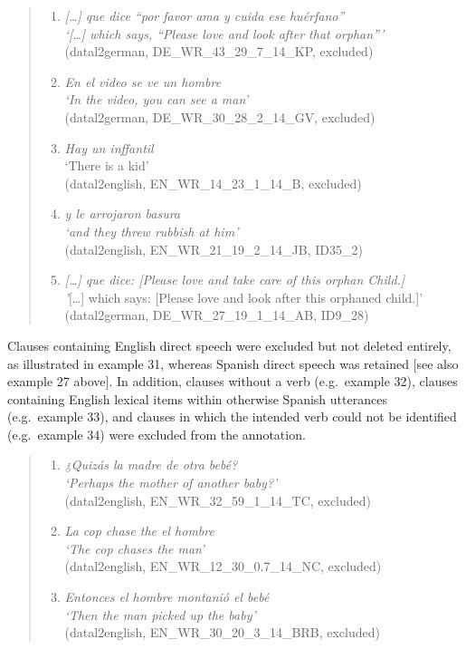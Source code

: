 \documentclass[
  letterpaper,
  DIV=11,
  numbers=noendperiod]{scrartcl}
\providecommand{\tightlist}{%
  \setlength{\itemsep}{0pt}\setlength{\parskip}{0pt}}
\begin{document}
\begin{quote}
\begin{enumerate}
\def\labelenumi{\arabic{enumi}.}
\setcounter{enumi}{26}
\item
  \emph{{[}\ldots{]} que dice ``por favor ama y cuida ese huérfano''\\
  `\emph{{[}\ldots{]} which says, ``Please love and look after that
  orphan''}'}\\
  (datal2german, DE\_WR\_43\_29\_7\_14\_KP, excluded)
\item
  \emph{En el video se ve un hombre\\
  `\emph{In the video, you can see a man}'}\\
  (datal2german, DE\_WR\_30\_28\_2\_14\_GV, excluded)
\item
  \emph{Hay un inffantil}\\
  `There is a kid'\\
  (datal2english, EN\_WR\_14\_23\_1\_14\_B, excluded)
\item
  \emph{y le arrojaron basura\\
  `\emph{and they threw rubbish at him}'}\\
  (datal2english, EN\_WR\_21\_19\_2\_14\_JB, ID35\_2)
\item
  \emph{{[}\ldots{]} que dice: {[}Please love and take care of this
  orphan Child.{]}\\
  '}{[}\ldots{]} which says: {[}Please love and look after this orphaned
  child.{]}'\\
  (datal2german, DE\_WR\_27\_19\_1\_14\_AB, ID9\_28)
\end{enumerate}
\end{quote}

Clauses containing English direct speech were excluded but not deleted
entirely, as illustrated in example 31, whereas Spanish direct speech
was retained {[}see also example 27 above{]}. In addition, clauses
without a verb (e.g.~example 32), clauses containing English lexical
items within otherwise Spanish utterances (e.g.~example 33), and clauses
in which the intended verb could not be identified (e.g.~example 34)
were excluded from the annotation.

\begin{quote}
\begin{enumerate}
\def\labelenumi{\arabic{enumi}.}
\setcounter{enumi}{31}
\tightlist
\item
  \emph{¿Quizás la madre de otra bebé?\\
  `\emph{Perhaps the mother of another baby?}'}\\
  (datal2english, EN\_WR\_32\_59\_1\_14\_TC, excluded)
\item
  \emph{La cop chase the el hombre\\
  `\emph{The cop chases the man}'}\\
  (datal2english, EN\_WR\_12\_30\_0.7\_14\_NC, excluded)
\item
  \emph{Entonces el hombre montanió el bebé\\
  `\emph{Then the man picked up the baby}'}\\
  (datal2english, EN\_WR\_30\_20\_3\_14\_BRB, excluded)
\end{enumerate}
\end{quote}
\end{document}

